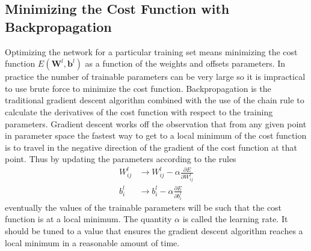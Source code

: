 \documentclass{article}
\begin{document}
\subsection*{Minimizing the Cost Function with Backpropagation}
Optimizing the network for a particular training set means minimizing the cost function $E \left(\textbf{W}^l, \textbf{b}^l \right)$ as a function of the weights and offsets parameters. In practice the number of trainable parameters can be very large so it is impractical to use brute force to minimize the cost function. Backpropagation is the traditional gradient descent algorithm combined with the use of the chain rule to calculate the derivatives of the cost function with respect to the training parameters. Gradient descent works off the observation that from any given point in parameter space the fastest way to get to a local minimum of the cost function is to travel in the negative direction of the gradient of the cost function at that point. Thus by updating the parameters according to the rules
\begin{equation}
\begin{split}
W^l_{ij} & \rightarrow W^l_{ij} - \alpha \frac{\partial E}{\partial W^l_{ij}} \\
b^l_i & \rightarrow b^l_{i} - \alpha \frac{\partial E}{\partial b^l_i} 
\end{split}
\end{equation}
eventually the values of the trainable parameters will be such that the cost function is at a local minimum. The quantity $\alpha$ is called the learning rate. It should be tuned to a value that ensures the gradient descent algorithm reaches a local minimum in a reasonable amount of time.
\end{document}
